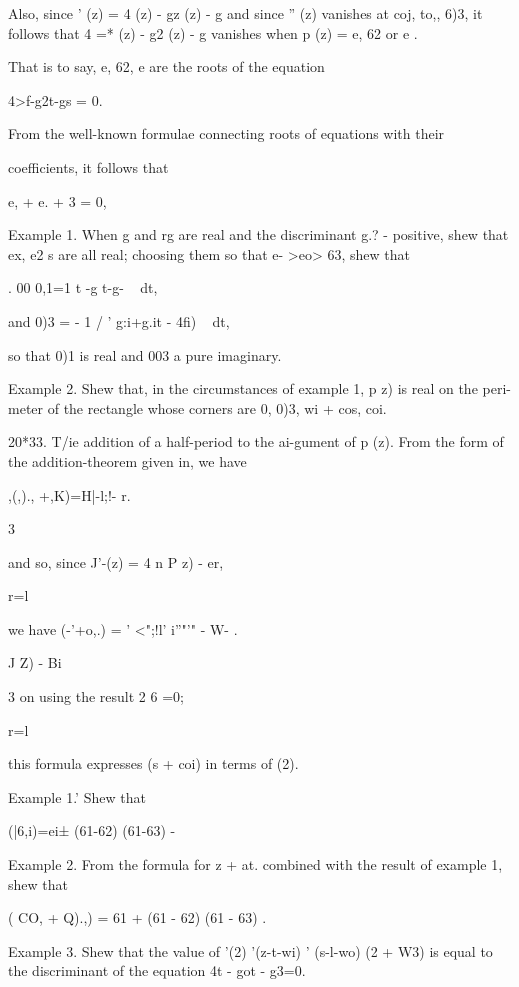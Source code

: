 {Also, since ' (z) = 4 (z) - gz (z) - g and since '' (z) vanishes at
coj, to,, 6)3, it follows that 4 =* (z) - g2 (z) - g vanishes when p
(z) = e, 62 or e .

That is to say, e, 62, e are the roots of the equation

4>f-g2t-gs = 0.

%
%

From the well-known formulae connecting roots of equations with their

coefficients, it follows that

e, + e. + 3 = 0,

Example 1. When g and rg are real and the discriminant g.? - %
positive, shew that ex, e2 s are all real; choosing them so that e-
>eo> 63, shew that

. 00 0,1=1 t -g t-g- ~ dt,

and 0)3 = - 1 / ' g:i+g.it - 4fi) ~ dt,

so that 0)1 is real and 003 a pure imaginary.

Example 2. Shew that, in the circumstances of example 1, p z) is real
on the peri- meter of the rectangle whose corners are 0, 0)3, wi +
cos, coi.

20*33. T/ie addition of a half-period to the ai-gument of p (z). From
the form of the addition-theorem given in, we have

,(,)., +,K)=H|-l;!- r.

3

and so, since J'-(z) = 4 n P z) - er,

r=l

we have (-'+o,.) = ' <";!l' i''"'" - W- .

 J Z) - Bi

3 on using the result 2 6 =0;

r=l

this formula expresses (s + coi) in terms of (2).

Example 1.' Shew that

  (|6,i)=ei± (61-62) (61-63) - 

Example 2. From the formula for z + at. combined with the result of
example 1, shew that

  ( CO, + Q).,) = 61 + (61 - 62) (61 - 63) .


Example 3. Shew that the value of '(2) '(z-t-wi) ' (s-l-wo) (2 + W3)
is equal to the discriminant of the equation 4t - got - g3=0.

}
